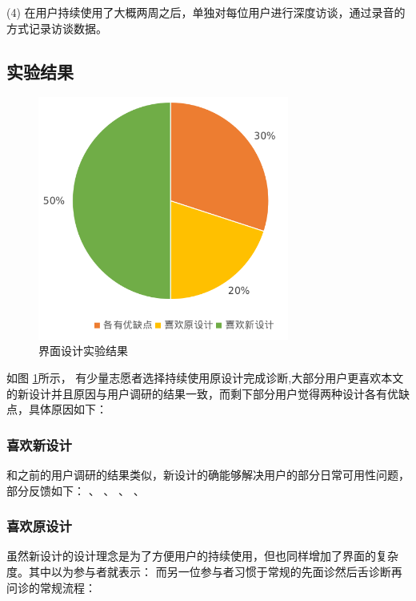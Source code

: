 (4)  在用户持续使用了大概两周之后，单独对每位用户进行深度访谈，通过录音的方式记录访谈数据。



\subsection{实验结果}


\begin{figure}[ht]
    \centering
    \includegraphics[height=8cm]{images/ui-exp.png}
    \caption{界面设计实验结果}
    \label{fig:ui-exp}
\end{figure}

如图 \ref{fig:ui-exp}所示， 有少量志愿者选择持续使用原设计完成诊断,大部分用户更喜欢本文的新设计并且原因与用户调研的结果一致，而剩下部分用户觉得两种设计各有优缺点，具体原因如下：


\subsubsection{喜欢新设计}

和之前的用户调研的结果类似，新设计的确能够解决用户的部分日常可用性问题，部分反馈如下：
、
、
、
、


\subsubsection{喜欢原设计}
虽然新设计的设计理念是为了方便用户的持续使用，但也同样增加了界面的复杂度。其中以为参与者就表示：
而另一位参与者习惯于常规的先面诊然后舌诊断再问诊的常规流程：

